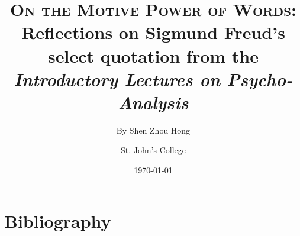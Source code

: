 \documentclass[
  12pt,       %
  a4paper,    %
  final,      %
  onecolumn,  %
  oneside,    %
  notitlepage %
]{article}
\title{
  \textbf{\textsc{On the Motive Power of Words}}: \\ Reflections on Sigmund Freud's select quotation from the \emph{Introductory Lectures on Psycho-Analysis}
}
\author{
  By Shen Zhou Hong \and St. John's College
}
\date{\today}
\begin{document}
\maketitle

% 


\nocite{*}

\clearpage
\section*{Bibliography}
\printbibliography[heading=none]
\end{document}

